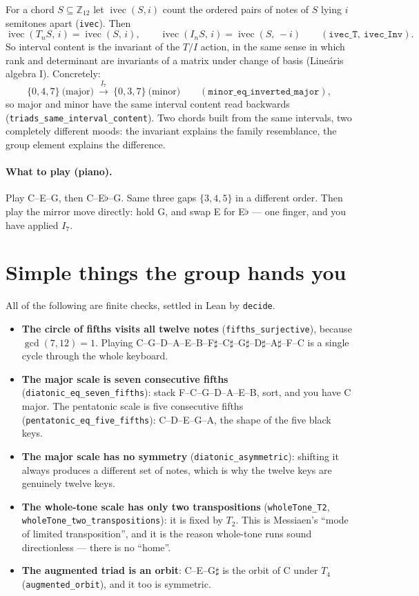 \documentclass[11pt,a4paper]{article}
\newcommand{\Z}{\mathbb{Z}}
\newcommand{\PC}{\Z_{12}}
\newcommand{\lean}[1]{\texttt{#1}}
\begin{document}
For a chord $S\subseteq\PC$ let $\operatorname{ivec}(S,i)$ count the ordered pairs of
notes of $S$ lying $i$ semitones apart (\lean{ivec}). Then
\[
  \operatorname{ivec}(T_n S,\,i)=\operatorname{ivec}(S,\,i),\qquad
  \operatorname{ivec}(I_n S,\,i)=\operatorname{ivec}(S,\,-i)
  \qquad (\lean{ivec\_T},\ \lean{ivec\_Inv}).
\]
So interval content is the invariant of the $T/I$ action, in the same sense in
which rank and determinant are invariants of a matrix under change of basis
(Lineáris algebra I). Concretely:
\[
  \{0,4,7\}\ \text{(major)}\ \xrightarrow{\;I_7\;}\ \{0,3,7\}\ \text{(minor)}
  \qquad (\lean{minor\_eq\_inverted\_major}),
\]
so major and minor have the same interval content read backwards
(\lean{triads\_same\_interval\_content}). Two chords built from the same
intervals, two completely different moods: the invariant explains the family
resemblance, the group element explains the difference.

\paragraph{What to play (piano).}
Play C--E--G, then C--E$\flat$--G. Same three gaps $\{3,4,5\}$ in a different
order. Then play the mirror move directly: hold G, and swap E for E$\flat$ ---
one finger, and you have applied $I_7$.

\section{Simple things the group hands you}

All of the following are finite checks, settled in Lean by \lean{decide}.

\begin{itemize}[leftmargin=1.4em]
\item \textbf{The circle of fifths visits all twelve notes}
      (\lean{fifths\_surjective}), because $\gcd(7,12)=1$. Playing
      C--G--D--A--E--B--F$\sharp$--C$\sharp$--G$\sharp$--D$\sharp$--A$\sharp$--F--C
      is a single cycle through the whole keyboard.
\item \textbf{The major scale is seven consecutive fifths}
      (\lean{diatonic\_eq\_seven\_fifths}): stack F--C--G--D--A--E--B, sort, and
      you have C major. The pentatonic scale is five consecutive fifths
      (\lean{pentatonic\_eq\_five\_fifths}): C--D--E--G--A, the shape of the five black keys.
\item \textbf{The major scale has no symmetry}
      (\lean{diatonic\_asymmetric}): shifting it always produces a different set
      of notes, which is why the twelve keys are genuinely twelve keys.
\item \textbf{The whole-tone scale has only two transpositions}
      (\lean{wholeTone\_T2}, \lean{wholeTone\_two\_transpositions}): it is fixed by
      $T_2$. This is Messiaen's ``mode of limited transposition'', and it is the
      reason whole-tone runs sound directionless --- there is no ``home''.
\item \textbf{The augmented triad is an orbit}: C--E--G$\sharp$ is the orbit of C
      under $T_4$ (\lean{augmented\_orbit}), and it too is symmetric.
\end{itemize}
\end{document}
